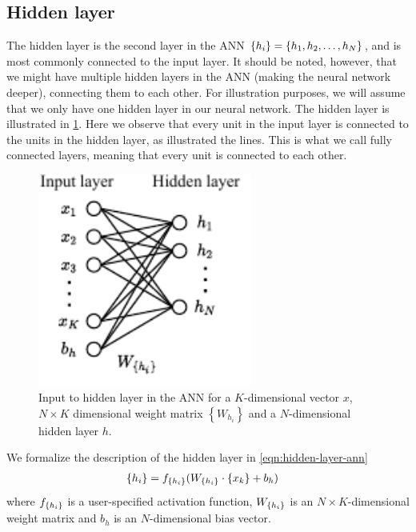 \subsection{Hidden layer}
The hidden layer is the second layer in the ANN $\left\{ {h}_{i} \right\} = \left\{ h_1, h_2, \ldots, h_N \right\}$, and is most commonly connected to the input layer. It should be noted, however, that we might have multiple hidden layers in the ANN (making the neural network deeper), connecting them to each other. For illustration purposes, we will assume that we only have one hidden layer in our neural network. The hidden layer is illustrated in \cref{fig:hidden_layer_ann}. Here we observe that every unit in the input layer is connected to the units in the hidden layer, as illustrated the lines. This is what we call fully connected layers, meaning that every unit is connected to each other.

\begin{figure}[H]
    \centering
    \includegraphics[height=7cm]{thesis/figures/artificial-neural-network-input-hidden-layer_cropped.pdf}
    \caption{Input to hidden layer in the ANN for a $K$-dimensional vector $x$, $N\times K$ dimensional weight matrix $\left\{ W_{h_i} \right\}$ and a $N$-dimensional hidden layer $h$.}
    \label{fig:hidden_layer_ann}
\end{figure}

We formalize the description of the hidden layer in \cref{eqn:hidden-layer-ann}
\begin{align}
    \label{eqn:hidden-layer-ann}
    \left\{ {h}_{i} \right\} &= f_{\left\{ {h}_{i} \right\}}(W_{\left\{ {h}_{i} \right\}} \cdot \left\{ {x}_{k} \right\} + b_h)
\end{align}
where $f_{\left\{ {h}_{i} \right\}}$ is a user-specified activation function, $W_{\left\{ {h}_{i} \right\}}$ is an $N \times K$-dimensional weight matrix and $b_h$ is an $N$-dimensional bias vector.

